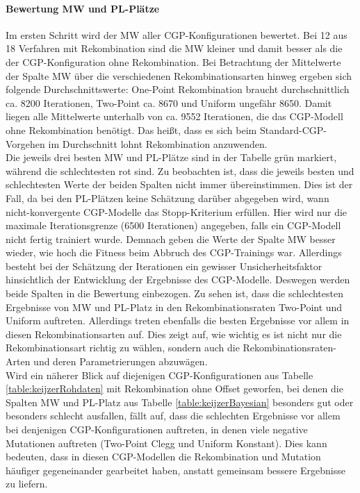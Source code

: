 \paragraph{Bewertung MW und PL-Plätze}
Im ersten Schritt wird der MW aller CGP-Konfigurationen bewertet.
Bei 12 aus 18 Verfahren mit Rekombination sind die MW kleiner und damit besser als die der CGP-Konfiguration ohne Rekombination.
Bei Betrachtung der Mittelwerte der Spalte MW über die verschiedenen Rekombinationsarten hinweg ergeben sich folgende Durchschnittswerte: One-Point Rekombination braucht durchschnittlich ca. 8200 Iterationen, Two-Point ca. 8670 und Uniform ungefähr 8650.
Damit liegen alle Mittelwerte unterhalb von ca. 9552 Iterationen, die das CGP-Modell ohne Rekombination benötigt.
Das heißt, dass es sich beim Standard-CGP-Vorgehen im Durchschnitt lohnt Rekombination anzuwenden.\\
Die jeweils drei besten MW und PL-Plätze sind in der Tabelle grün markiert, während die schlechtesten rot sind.
Zu beobachten ist, dass die jeweils besten und schlechtesten Werte der beiden Spalten nicht immer übereinstimmen.
Dies ist der Fall, da bei den PL-Plätzen keine Schätzung darüber abgegeben wird, wann nicht-konvergente CGP-Modelle das Stopp-Kriterium erfüllen. 
Hier wird nur die maximale Iterationsgrenze (6500 Iterationen) angegeben, falls ein CGP-Modell nicht fertig trainiert wurde.
Demnach geben die Werte der Spalte MW besser wieder, wie hoch die Fitness beim Abbruch des CGP-Trainings war.
Allerdings besteht bei der Schätzung der Iterationen ein gewisser Unsicherheitsfaktor hinsichtlich der Entwicklung der Ergebnisse des CGP-Modelle.
Deswegen werden beide Spalten in die Bewertung einbezogen.
Zu sehen ist, dass die schlechtesten Ergebnisse von MW und PL-Platz in den Rekombinationsraten Two-Point und Uniform auftreten.
Allerdings treten ebenfalls die besten Ergebnisse vor allem in diesen Rekombinationsarten auf.
Dies zeigt auf, wie wichtig es ist nicht nur die Rekombinationsart richtig zu wählen, sondern auch die Rekombinationsraten-Arten und deren Parametrierungen abzuwägen.\\
Wird ein näherer Blick auf diejenigen CGP-Konfigurationen aus Tabelle \ref{table:keijzerRohdaten} mit Rekombination ohne Offset geworfen, bei denen die Spalten MW und PL-Platz aus Tabelle \ref{table:keijzerBayesian} besonders gut oder besonders schlecht ausfallen, fällt auf, dass die schlechten Ergebnisse vor allem bei denjenigen CGP-Konfigurationen auftreten, in denen viele negative Mutationen auftreten (Two-Point Clegg und Uniform Konstant).
Dies kann bedeuten, dass in diesen CGP-Modellen die Rekombination und Mutation häufiger gegeneinander gearbeitet haben, anstatt gemeinsam bessere Ergebnisse zu liefern.

